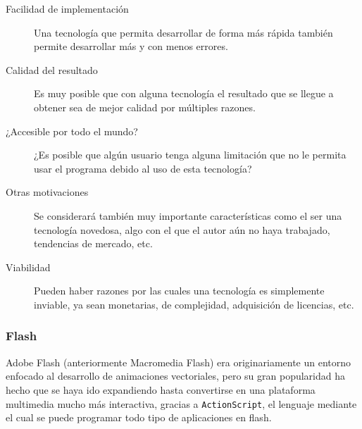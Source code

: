 \begin{description}
	\item[Facilidad de implementación] Una tecnología que permita desarrollar de forma más rápida también permite desarrollar más y con menos errores.
	\item[Calidad del resultado] Es muy posible que con alguna tecnología el resultado que se llegue a obtener sea de mejor calidad por múltiples razones.
	\item[¿Accesible por todo el mundo?] ¿Es posible que algún usuario tenga alguna limitación que no le permita usar el programa debido al uso de esta tecnología?
	\item[Otras motivaciones] Se considerará también muy importante características como el ser una tecnología novedosa, algo con el que el autor aún no haya trabajado, tendencias de mercado, etc.
	\item[Viabilidad] Pueden haber razones por las cuales una tecnología es simplemente inviable, ya sean monetarias, de complejidad, adquisición de licencias, etc.
\end{description}


\subsubsection{Flash}
Adobe Flash (anteriormente Macromedia Flash) era originariamente un entorno enfocado al desarrollo de animaciones vectoriales, pero su gran popularidad ha hecho que se haya ido expandiendo hasta convertirse en una plataforma multimedia mucho más interactiva, gracias a \texttt{ActionScript}, el lenguaje mediante el cual se puede programar todo tipo de aplicaciones en flash.

